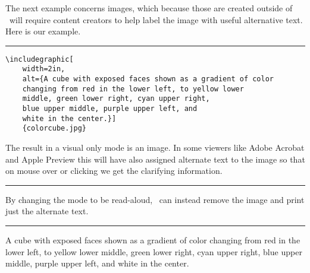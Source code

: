 \documentclass[presentation,aspectratio=169]{beamer}
\begin{document}
\begin{frame}[fragile]
    The next example concerns images, which because those are 
    created outside of \LaTeXe ~will require content creators to help 
    label the image with useful alternative text.  Here is our example.\\[20pt]
    
    \rule{\textwidth}{1pt}
\begin{lstlisting}
\includegraphic[
    width=2in, 
    alt={A cube with exposed faces shown as a gradient of color 
    changing from red in the lower left, to yellow lower 
    middle, green lower right, cyan upper right, 
    blue upper middle, purple upper left, and 
    white in the center.}]
    {colorcube.jpg}
\end{lstlisting}
        
\end{frame}

\begin{frame}
    The result in a visual only mode is an image.  In some viewers 
    like Adobe Acrobat and Apple Preview this will have also assigned alternate text to the image 
    so that on mouse over or clicking we get the clarifying information.\\[20pt]

    \rule{\textwidth}{1pt}
\end{frame}

\begin{frame}
    By changing the mode to be read-aloud, \LaTeXe ~can instead 
    remove the image and print just the alternate text. \\[20pt]

    \rule{\textwidth}{1pt}
    A cube with exposed faces shown as a gradient of color 
        changing from red in the lower left, to yellow lower 
        middle, green lower right, cyan upper right, 
        blue upper middle, purple upper left, and 
        white in the center.
\end{frame}
\end{document}
